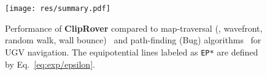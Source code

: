 

\begin{figure}[t]
    \centering
    \texttt{[image: res/summary.pdf]}%
    \vspace{-1mm}
    \caption{Performance of \textbf{ClipRover} compared to map-traversal (\eg, wavefront, random walk, wall bounce)~\cite{pang2019randoomwalk} and path-finding (Bug) algorithms~\cite{lumelsky1986dynamic,lumelsky1987path} for UGV navigation. The equipotential lines labeled as {\tt EP*} are defined by Eq.~\ref{eq:exp/epsilon}. %
    }
    \label{fig:overall}
    \vspace{-1mm}
\end{figure}

